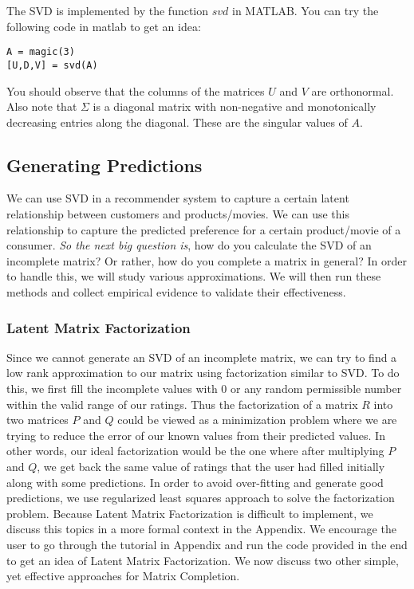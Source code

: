 The SVD is implemented by the function $svd$ in MATLAB. You can try the following code in matlab to get an idea:
\begin{verbatim}
A = magic(3)
[U,D,V] = svd(A)
\end{verbatim}

You should observe that the columns of the matrices $U$ and $V$ are orthonormal. Also note that $\Sigma$ is a diagonal matrix with non-negative and monotonically decreasing entries along the diagonal. These are the singular values of $A$.
  \subsection{Generating Predictions}
  We can use SVD in a recommender system to capture a certain latent relationship between customers and products/movies. We can use this relationship to capture the predicted preference for a certain product/movie of a consumer. \textit{So the next big question is}, how do you calculate the SVD of an incomplete matrix? Or rather, how do you complete a matrix in general? In order to handle this, we will study various approximations. We will then run these methods and collect empirical evidence to validate their effectiveness.
  \subsubsection{Latent Matrix Factorization}
  Since we cannot generate an SVD of an incomplete matrix, we can try to find a low rank approximation to our matrix using factorization similar to SVD. To do this, we first fill the incomplete values with 0 or any random permissible number within the valid range of our ratings. Thus the factorization of a matrix $R$ into two matrices $P$ and $Q$ could be viewed as a minimization problem where we are trying to reduce the error of our known values from their predicted values. In other words, our ideal factorization would be the one where after multiplying $P$ and $Q$, we get back the same value of ratings that the user had filled initially along with some predictions. In order to avoid over-fitting and generate good predictions, we use regularized least squares approach to solve the factorization problem. Because Latent Matrix Factorization is difficult to implement, we discuss this topics in a more formal context in the Appendix. We encourage the user to go through the tutorial in Appendix and run the code provided in the end to get an idea of Latent Matrix Factorization. We now discuss two other simple, yet effective approaches for Matrix Completion.
